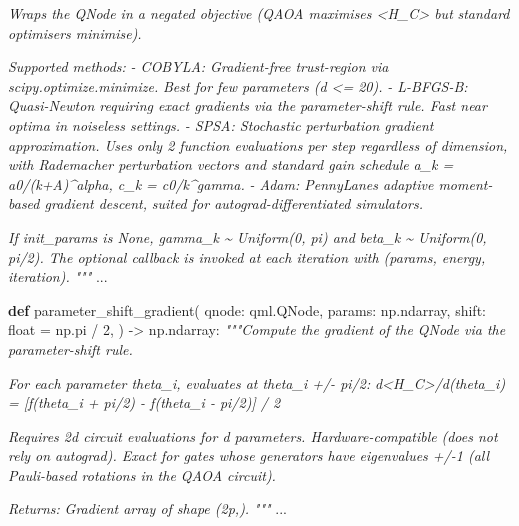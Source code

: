 \documentclass[
  11pt,
]{report}
\newenvironment{Shaded}{}{}
\newcommand{\BuiltInTok}[1]{\textcolor[rgb]{0.00,0.50,0.00}{#1}}
\newcommand{\CommentTok}[1]{\textcolor[rgb]{0.38,0.63,0.69}{\textit{#1}}}
\newcommand{\DecValTok}[1]{\textcolor[rgb]{0.25,0.63,0.44}{#1}}
\newcommand{\KeywordTok}[1]{\textcolor[rgb]{0.00,0.44,0.13}{\textbf{#1}}}
\newcommand{\NormalTok}[1]{#1}
\newcommand{\OperatorTok}[1]{\textcolor[rgb]{0.40,0.40,0.40}{#1}}
\begin{document}
\begin{Shaded}
\begin{Highlighting}[]
\CommentTok{    Wraps the QNode in a negated objective (QAOA maximises \textless{}H\_C\textgreater{} but}
\CommentTok{    standard optimisers minimise).}

\CommentTok{    Supported methods:}
\CommentTok{        {-} \textquotesingle{}COBYLA\textquotesingle{}: Gradient{-}free trust{-}region via scipy.optimize.minimize.}
\CommentTok{          Best for few parameters (d \textless{}= 20).}
\CommentTok{        {-} \textquotesingle{}L{-}BFGS{-}B\textquotesingle{}: Quasi{-}Newton requiring exact gradients via the}
\CommentTok{          parameter{-}shift rule. Fast near optima in noiseless settings.}
\CommentTok{        {-} \textquotesingle{}SPSA\textquotesingle{}: Stochastic perturbation gradient approximation. Uses}
\CommentTok{          only 2 function evaluations per step regardless of dimension,}
\CommentTok{          with Rademacher perturbation vectors and standard gain schedule}
\CommentTok{          a\_k = a0/(k+A)\^{}alpha, c\_k = c0/k\^{}gamma.}
\CommentTok{        {-} \textquotesingle{}Adam\textquotesingle{}: PennyLane\textquotesingle{}s adaptive moment{-}based gradient descent,}
\CommentTok{          suited for autograd{-}differentiated simulators.}

\CommentTok{    If init\_params is None, gamma\_k \textasciitilde{} Uniform(0, pi) and}
\CommentTok{    beta\_k \textasciitilde{} Uniform(0, pi/2). The optional callback is invoked at}
\CommentTok{    each iteration with (params, energy, iteration).}
\CommentTok{    """}
\NormalTok{    ...}


\KeywordTok{def}\NormalTok{ parameter\_shift\_gradient(}
\NormalTok{    qnode: qml.QNode,}
\NormalTok{    params: np.ndarray,}
\NormalTok{    shift: }\BuiltInTok{float} \OperatorTok{=}\NormalTok{ np.pi }\OperatorTok{/} \DecValTok{2}\NormalTok{,}
\NormalTok{) }\OperatorTok{{-}\textgreater{}}\NormalTok{ np.ndarray:}
    \CommentTok{"""Compute the gradient of the QNode via the parameter{-}shift rule.}

\CommentTok{    For each parameter theta\_i, evaluates at theta\_i +/{-} pi/2:}
\CommentTok{        d\textless{}H\_C\textgreater{}/d(theta\_i) = [f(theta\_i + pi/2) {-} f(theta\_i {-} pi/2)] / 2}

\CommentTok{    Requires 2d circuit evaluations for d parameters. Hardware{-}compatible}
\CommentTok{    (does not rely on autograd). Exact for gates whose generators have}
\CommentTok{    eigenvalues +/{-}1 (all Pauli{-}based rotations in the QAOA circuit).}

\CommentTok{    Returns:}
\CommentTok{        Gradient array of shape (2p,).}
\CommentTok{    """}
\NormalTok{    ...}
\end{Highlighting}
\end{Shaded}
\end{document}

